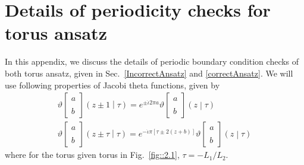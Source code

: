 \documentclass[prb,aps,epsfig,longbibliography,twocolumn]{revtex4-1}
\newcommand{\sbkt}[1]{\left[ #1\right]}
\newcommand{\jbkt}[2]{\left( #1 \middle| #2\right)}
\newcommand{\rtheta}[4]{\vartheta \sbkt{ \substack{{#1} \\ \\{#2}}}	\jbkt{#3}{#4}}
\newcommand{\iiota}{\dot{\iota}}
\begin{document}
\section{Details of periodicity checks for torus ansatz} \label{periodicityChecks}
In this appendix, we discuss the details of periodic boundary condition checks of both torus ansatz, given in Sec.~\ref{IncorrectAnsatz} and \ref{correctAnsatz}. We will use following properties of Jacobi theta functions, given by
\begin{gather}
\rtheta{a}{b}{z\pm1}{\tau} = e^{\pm\iiota 2\pi a}\rtheta{a}{b}{z}{\tau}\nonumber
\\[5pt]
\rtheta{a}{b}{z\pm\tau}{\tau} = e^{-\iiota \pi [\tau \pm 2(z+b)]}\rtheta{a}{b}{z}{\tau} 	\label{app:theta}
\end{gather}
where for the torus given torus in Fig.~\ref{fig::2.1}, $\tau=-L_1/L_2$.
\end{document}
